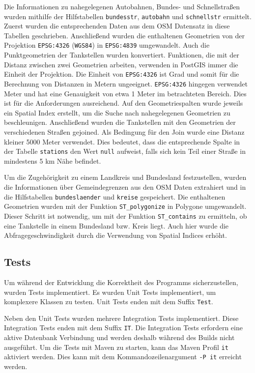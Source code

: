 \documentclass[
ngerman          %
,a4paper          %
,11pt
,pdftex
]{report}
\begin{document}
Die Informationen zu nahegelegenen Autobahnen, Bundes- und Schnellstraßen wurden mithilfe der Hilfstabellen \texttt{bundesstr}, \texttt{autobahn} und \texttt{schnellstr} ermittelt. Zuerst wurden die entsprechenden Daten aus dem \ac{OSM} Datensatz in diese Tabellen geschrieben. Anschließend wurden die enthaltenen Geometrien von der Projektion \texttt{EPSG:4326} (\texttt{WGS84}) in \texttt{EPSG:4839} umgewandelt. Auch die Punktgeometrien der Tankstellen wurden konvertiert. Funktionen, die mit der Distanz zwischen zwei Geometrien arbeiten, verwenden in PostGIS immer die Einheit der Projektion. Die Einheit von \texttt{EPSG:4326} ist Grad und somit für die Berechnung von Distanzen in Metern ungeeignet. \texttt{EPSG:4326} hingegen verwendet Meter und hat eine Genauigkeit von etwa 1 Meter im betrachteten Bereich. Dies ist für die Anforderungen ausreichend. Auf den Geometriespalten wurde jeweils ein Spatial Index erstellt, um die Suche nach nahegelegenen Geometrien zu beschleunigen. Anschließend wurden die Tankstellen mit den Geometrien der verschiedenen Straßen gejoined. Als Bedingung für den Join wurde eine Distanz kleiner 5000 Meter verwendet. Dies bedeutet, dass die entsprechende Spalte in der Tabelle \texttt{stations} den Wert \texttt{null} aufweist, falls sich kein Teil einer Straße in mindestens 5 km Nähe befindet.

Um die Zugehörigkeit zu einem Landkreis und Bundesland festzustellen, wurden die Informationen über Gemeindegrenzen aus den \ac{OSM} Daten extrahiert und in die Hilfstabellen \texttt{bundeslaender} und \texttt{kreise} gespeichert. Die enthaltenen Geometrien wurden mit der Funktion \texttt{ST\_polygonize} in Polygone umgewandelt. Dieser Schritt ist notwendig, um mit der Funktion \texttt{ST\_contains} zu ermitteln, ob eine Tankstelle in einem Bundesland bzw. Kreis liegt. Auch hier wurde die Abfragegeschwindigkeit durch die Verwendung von Spatial Indices erhöht.

\subsection{Tests}

Um während der Entwicklung die Korrektheit des Programms sicherzustellen, wurden Tests implementiert. Es wurden Unit Tests implementiert, um komplexere Klassen zu testen. Unit Tests enden mit dem Suffix \texttt{Test}.

Neben den Unit Tests wurden mehrere Integration Tests implementiert. Diese Integration Tests enden mit dem Suffix \texttt{IT}. Die Integration Tests erfordern eine aktive Datenbank Verbindung und werden deshalb während des Builds nicht ausgeführt. Um die Tests mit Maven zu starten, kann das Maven Profil \texttt{it} aktiviert werden. Dies kann mit dem Kommandozeilenargument \texttt{-P it} erreicht werden.
\end{document}

